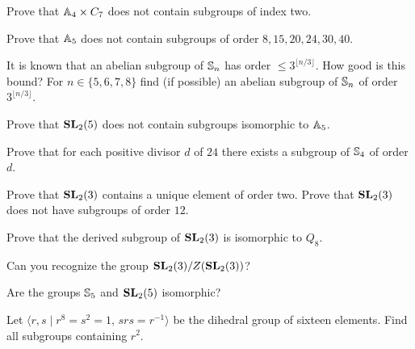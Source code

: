 \begin{prob}
Prove that $\mathbb{A}_4\times C_7$ does not contain subgroups of index two.
\end{prob}

\begin{prob}
  \label{prob:A5:8,15,20,24,30,49}
  Prove that $\mathbb{A}_5$ does not contain subgroups of order $8,15,20,24,30,40$. 
\end{prob}

\begin{prob}
  It is known that an abelian subgroup of $\mathbb{S}_n$ has order
  $\leq3^{\lfloor n/3\rfloor}$. How good is this bound? For
  $n\in\{5,6,7,8\}$ find (if possible) an abelian subgroup of $\mathbb{S}_n$ of
  order $3^{\lfloor n/3\rfloor}$. 
\end{prob}

\begin{prob}
    Prove that $\mathbf{SL}_2(5)$ does not contain subgroups isomorphic to $\mathbb{A}_5$. 
\end{prob}

\begin{prob}
  Prove that for each positive divisor $d$ of $24$ there exists a subgroup of $\mathbb{S}_4$ of order $d$.
\end{prob}

\begin{prob} 
  Prove that $\mathbf{SL}_2(3)$ contains a unique element of order two. Prove that
  $\mathbf{SL}_2(3)$ does not have subgroups of order $12$.
\end{prob}

\begin{prob}
  Prove that the derived subgroup of $\mathbf{SL}_2(3)$ is isomorphic to $Q_8$.
\end{prob}

\begin{prob}
  Can you recognize the group $\mathbf{SL}_2(3)/Z(\mathbf{SL}_2(3))$? 
\end{prob}

\begin{prob}
  Are the groups $\mathbb{S}_5$ and $\mathbf{SL}_2(5)$ isomorphic?
\end{prob}

\begin{prob}
  Let $\langle r,s\mid 
  r^8=s^2=1,\,srs=r^{-1}\rangle$ be the dihedral group of sixteen elements. 
  Find all subgroups containing $r^2$.
\end{prob}

